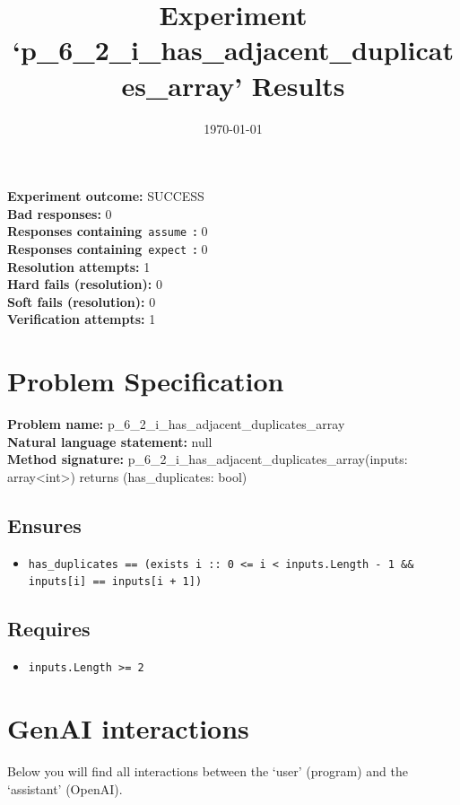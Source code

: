 \documentclass{article}
\begin{document}
\title{Experiment `p\_6\_2\_i\_has\_adjacent\_duplicates\_array' Results}
\author{\today}
\date{}
\maketitle
\textbf{Experiment outcome: }SUCCESS
\\\textbf{Bad responses: }0
\\\textbf{Responses containing}~\texttt{assume}~\textbf{: }0
\\\textbf{Responses containing}~\texttt{expect}~\textbf{: }0
\\\textbf{Resolution attempts: }1
\\\textbf{Hard fails (resolution): }0
\\\textbf{Soft fails (resolution): }0
\\\textbf{Verification attempts: }1
\section*{Problem Specification}
\textbf{Problem name: }p\_6\_2\_i\_has\_adjacent\_duplicates\_array
\\\textbf{Natural language statement: }null
\\\textbf{Method signature: }p\_6\_2\_i\_has\_adjacent\_duplicates\_array(inputs: array<int>) returns (has\_duplicates: bool)
\subsection*{Ensures}
\begin{itemize}
\item \texttt{has\_duplicates == (exists i :: 0 <= i < inputs.Length - 1 \&\& inputs[i] == inputs[i + 1])}
\end{itemize}
\subsection*{Requires}
\begin{itemize}
\item \texttt{inputs.Length >= 2}
\end{itemize}
\clearpage
\section*{GenAI interactions}
Below you will find all interactions between the `user' (program) and the `assistant' (OpenAI).
\end{document}
